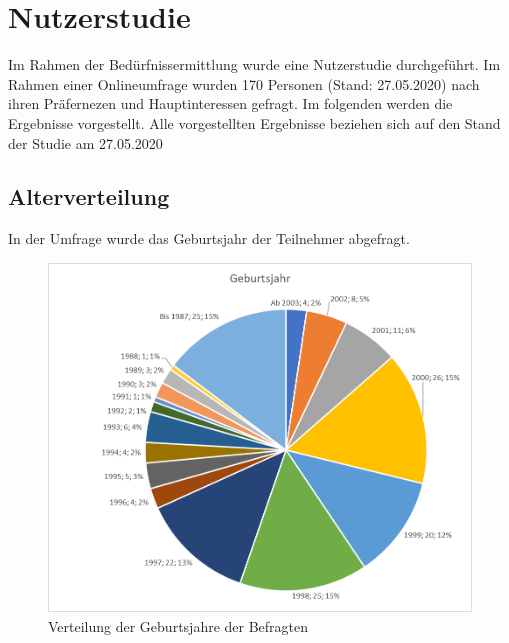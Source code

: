 \section{Nutzerstudie}
Im Rahmen der Bedürfnissermittlung wurde eine Nutzerstudie durchgeführt. Im Rahmen einer Onlineumfrage wurden 170 Personen (Stand: 27.05.2020) nach ihren Präfernezen und Hauptinteressen gefragt. Im folgenden werden die Ergebnisse vorgestellt.
Alle vorgestellten Ergebnisse beziehen sich auf den Stand der Studie am 27.05.2020\\

\subsection{Alterverteilung}
In der Umfrage wurde das Geburtsjahr der Teilnehmer abgefragt.
\\
\begin{figure}[h]
    \centering
    \includegraphics[scale=0.3]{media/diagram/geburtsjahr.png}
    \caption{Verteilung der Geburtsjahre der Befragten}
\end{figure}
\\
